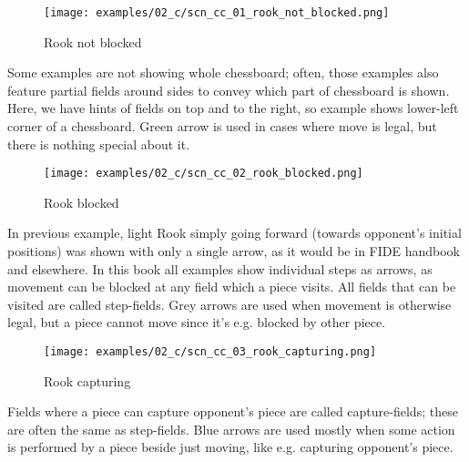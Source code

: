 \vspace*{-0.7\baselineskip}
\noindent
\begin{wrapfigure}[12]{l}{0.4\textwidth}
\centering
\texttt{[image: examples/02\_c/scn\_cc\_01\_rook\_not\_blocked.png]}
\vspace*{-1.4\baselineskip}
\caption{Rook not blocked}
\label{fig:scn_cc_01_rook_not_blocked}
\end{wrapfigure}
Some examples are not showing whole chessboard; often, those examples also
feature partial fields around sides to convey which part of chessboard is
shown. \newline
\indent
Here, we have hints of fields on top and to the right, so example shows
lower-left corner of a chessboard. \newline
\indent
Green arrow is used in cases where move is legal, but there is nothing special
about it.

\vspace*{2.7\baselineskip}
\noindent
\begin{wrapfigure}[14]{l}{0.4\textwidth}
\centering
\texttt{[image: examples/02\_c/scn\_cc\_02\_rook\_blocked.png]}
\vspace*{-1.4\baselineskip}
\caption{Rook blocked}
\label{fig:scn_cc_02_rook_blocked}
\end{wrapfigure}
In previous example, light Rook simply going forward (towards opponent's initial
positions) was shown with only a single arrow, as it would be in FIDE handbook and
elsewhere. \newline
\indent
In this book all examples show individual steps as arrows, as movement can be
blocked at any field which a piece visits. All fields that can be visited are
called step-fields. \newline
\indent
Grey arrows are used when movement is otherwise legal, but a piece cannot move
since it's e.g. blocked by other piece.

\clearpage %

\vspace*{-1.4\baselineskip}
\noindent
\begin{wrapfigure}[8]{l}{0.4\textwidth}
\centering
\texttt{[image: examples/02\_c/scn\_cc\_03\_rook\_capturing.png]}
\vspace*{-1.4\baselineskip}
\caption{Rook capturing}
\label{fig:scn_cc_03_rook_capturing}
\end{wrapfigure}
Fields where a piece can capture opponent's piece are called capture-fields;
these are often the same as step-fields. \newline
\indent
Blue arrows are used mostly when some action is performed by a piece beside just
moving, like e.g. capturing opponent's piece.

